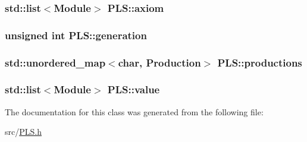 \subsubsection[{\texorpdfstring{axiom}{axiom}}]{\setlength{\rightskip}{0pt plus 5cm}std\+::list$<${\bf Module}$>$ P\+L\+S\+::axiom\hspace{0.3cm}{\ttfamily [protected]}}\hypertarget{class_p_l_s_a5de46c72cd9ef4006f7f1ed43ac028c1}{}\label{class_p_l_s_a5de46c72cd9ef4006f7f1ed43ac028c1}
\subsubsection[{\texorpdfstring{generation}{generation}}]{\setlength{\rightskip}{0pt plus 5cm}unsigned int P\+L\+S\+::generation\hspace{0.3cm}{\ttfamily [protected]}}\hypertarget{class_p_l_s_a056f4e66546bc58aaa68f68b6ac0e902}{}\label{class_p_l_s_a056f4e66546bc58aaa68f68b6ac0e902}
\subsubsection[{\texorpdfstring{productions}{productions}}]{\setlength{\rightskip}{0pt plus 5cm}std\+::unordered\+\_\+map$<$char, {\bf Production}$>$ P\+L\+S\+::productions\hspace{0.3cm}{\ttfamily [protected]}}\hypertarget{class_p_l_s_a2bdf324e0d0ed4e1c3265d4029f83f0b}{}\label{class_p_l_s_a2bdf324e0d0ed4e1c3265d4029f83f0b}
\subsubsection[{\texorpdfstring{value}{value}}]{\setlength{\rightskip}{0pt plus 5cm}std\+::list$<${\bf Module}$>$ P\+L\+S\+::value\hspace{0.3cm}{\ttfamily [protected]}}\hypertarget{class_p_l_s_adf032e0f090c28370850ee026375f826}{}\label{class_p_l_s_adf032e0f090c28370850ee026375f826}


The documentation for this class was generated from the following file\+:\begin{DoxyCompactItemize}
\item 
src/\hyperlink{_p_l_s_8h}{P\+L\+S.\+h}\end{DoxyCompactItemize}
